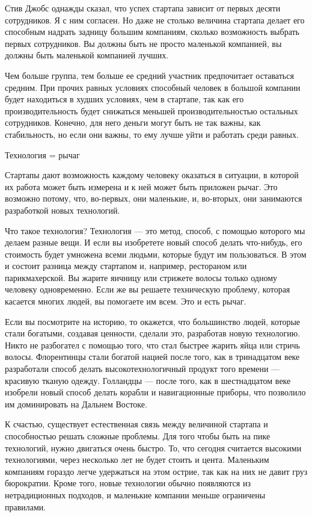 \documentclass[ebook,12pt,oneside,openany]{memoir}
\begin{document}
Стив Джобс однажды сказал, что успех стартапа зависит от первых десяти
сотрудников. Я с ним согласен. Но даже не столько величина стартапа
делает его способным надрать задницу большим компаниям, сколько
возможность выбрать первых сотрудников. Вы должны быть не просто
маленькой компанией, вы должны быть маленькой компанией лучших.

Чем больше группа, тем больше ее средний участник предпочитает
оставаться средним. При прочих равных условиях способный человек в
большой компании будет находиться в худших условиях, чем в стартапе,
так как его производительность будет снижаться меньшей
производительностью остальных сотрудников. Конечно, для него деньги
могут быть не так важны, как стабильность, но если они важны, то ему
лучше уйти и работать среди равных.

Технология = рычаг

Стартапы дают возможность каждому человеку оказаться в ситуации, в
которой их работа может быть измерена и к ней может быть приложен
рычаг. Это возможно потому, что, во-первых, они маленькие, и,
во-вторых, они занимаются разработкой новых технологий.

Что такое технология? Технология — это метод, способ, с помощью
которого мы делаем разные вещи. И если вы изобретете новый способ
делать что-нибудь, его стоимость будет умножена всеми людьми, которые
будут им пользоваться. В этом и состоит разница между стартапом и,
например, рестораном или парикмахерской. Вы жарите яичницу или
стрижете волосы только одному человеку одновременно. Если же вы
решаете техническую проблему, которая касается многих людей, вы
помогаете им всем. Это и есть рычаг.

Если вы посмотрите на историю, то окажется, что большинство людей,
которые стали богатыми, создавая ценности, сделали это, разработав
новую технологию. Никто не разбогател с помощью того, что стал быстрее
жарить яйца или стричь волосы. Флорентинцы стали богатой нацией после
того, как в тринадцатом веке разработали способ делать
высокотехнологичный продукт того времени — красивую тканую одежду.
Голландцы — после того, как в шестнадцатом веке изобрели новый способ
делать корабли и навигационные приборы, что позволило им доминировать
на Дальнем Востоке.

К счастью, существует естественная связь между величиной стартапа и
способностью решать сложные проблемы. Для того чтобы быть на пике
технологий, нужно двигаться очень быстро. То, что сегодня считается
высокими технологиями, через несколько лет не будет стоить и цента.
Маленьким компаниям гораздо легче удержаться на этом острие, так как
на них не давит груз бюрократии. Кроме того, новые технологии обычно
появляются из нетрадиционных подходов, и маленькие компании меньше
ограничены правилами.
\end{document}
